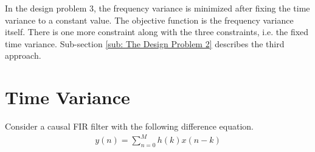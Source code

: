 In the design problem 3, the frequency variance is minimized after fixing the time variance to a constant value. The objective function is the frequency variance itself. There is one more constraint along with the three constraints, i.e. the fixed time variance. Sub-section \ref{sub: The Design Problem 2} describes the third approach. %
\section{Time Variance}
\label{sec: Time Variance}
Consider a causal FIR filter with the following difference equation.
\begin{eqnarray}
\label{filterIO}
y(n) = \sum_{n=0}^{M} h(k)x(n-k)
\end{eqnarray}

